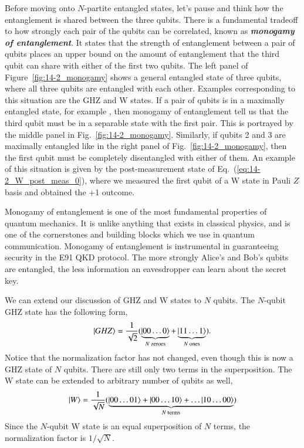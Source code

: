 Before moving onto $N$-partite entangled states, let's pause and think how the entanglement is shared between the three qubits.
There is a fundamental tradeoff to how strongly each pair of the qubits can be correlated, known as \emph{\textbf{monogamy of entanglement}}.
It states that the strength of entanglement between a pair of qubits places an upper bound on the amount of entanglement that the third qubit can share with either of the first two qubits.
The left panel of Figure~\ref{fig:14-2_monogamy} shows a general entangled state of three qubits, where all three qubits are entangled with each other.
Examples corresponding to this situation are the GHZ and W states.
If a pair of qubits is in a maximally entangled state, for example \ket{\Phi+}, then monogamy of entanglement tell us that the third qubit must be in a separable state with the first pair.
This is portrayed by the middle panel in Fig.~\ref{fig:14-2_monogamy}.
Similarly, if qubits 2 and 3 are maximally entangled like in the right panel of Fig.~\ref{fig:14-2_monogamy}, then the first qubit must be completely disentangled with either of them.
An example of this situation is given by the post-measurement state of Eq.~(\ref{eq:14-2_W_post_meas_0}), where we measured the first qubit of a W state in Pauli $Z$ basis and obtained the +1 outcome.

Monogamy of entanglement is one of the most fundamental properties of quantum mechanics.
It is unlike anything that exists in classical physics, and is one of the cornerstones and building blocks which we use in quantum communication.
Monogamy of entanglement is instrumental in guaranteeing security in the E91 QKD protocol.
The more strongly Alice's and Bob's qubits are entangled, the less information an eavesdropper can learn about the secret key.

We can extend our discussion of GHZ and W states to $N$ qubits.
The $N$-qubit GHZ state has the following form,
\begin{equation}
    \left| GHZ \right\rangle = \frac{1}{\sqrt{2}} ( \underbrace{\left| 00\ldots0 \right\rangle}_{N\text{ zeroes}} + \underbrace{\left| 11\ldots1 \right\rangle}_{N \text{ ones}} ).
\end{equation}
Notice that the normalization factor has not changed, even though this is now a GHZ state of $N$ qubits.
There are still only two terms in the superposition.
The W state can be extended to arbitrary number of qubits as well,
\begin{equation}
    \left| W \right\rangle = \frac{1}{\sqrt{N}} ( \underbrace{\left| 00\ldots01 \right\rangle + \left| 00\ldots10 \right\rangle + \ldots \left| 10\ldots00 \right\rangle}_{N \text{ terms}} )
\end{equation}
Since the $N$-qubit W state is an equal superposition of $N$ terms, the normalization factor is $1 / \sqrt{N}$.

